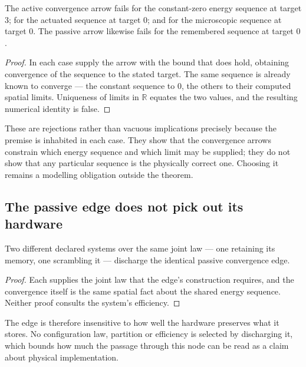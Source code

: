 \begin{claim}
The active convergence arrow fails for the constant-zero energy sequence at
target $3$; for the actuated sequence at target $0$; and for the microscopic
sequence at target $0$. The passive arrow likewise fails for the remembered
sequence at target $0$.
\end{claim}
\begin{proof}
In each case supply the arrow with the bound that does hold, obtaining
convergence of the sequence to the stated target. The same sequence is already
known to converge --- the constant sequence to $0$, the others to their computed
spatial limits. Uniqueness of limits in $\mathbb{R}$ equates the two values, and
the resulting numerical identity is false.
\end{proof}
\scope These are rejections rather than vacuous implications precisely because
the premise is inhabited in each case. They show that the convergence arrows
constrain which energy sequence and which limit may be supplied; they do not
show that any particular sequence is the physically correct one. Choosing it
remains a modelling obligation outside the theorem.

\subsection{The passive edge does not pick out its hardware}
\begin{claim}
Two different declared systems over the same joint law --- one retaining its
memory, one scrambling it --- discharge the identical passive convergence edge.
\end{claim}
\begin{proof}
Each supplies the joint law that the edge's construction requires, and the
convergence itself is the same spatial fact about the shared energy sequence.
Neither proof consults the system's efficiency.
\end{proof}
\scope The edge is therefore insensitive to how well the hardware preserves
what it stores. No configuration law, partition or efficiency is selected by
discharging it, which bounds how much the passage through this node can be read
as a claim about physical implementation.
